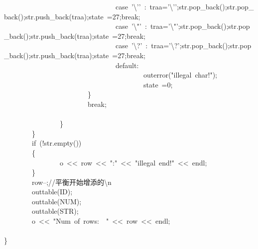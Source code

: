 \documentclass{article}
\begin{document}
\begin{mdpre}
~~~~~~~~~~~~~~~~~~~~~~~~~~~~~~~~{case}~{'}{\textbackslash{}'}{'}~:~traa={'}{\textbackslash{}'}{'};str.pop\_back();str.pop\_back();str.push\_back(traa);state~={27};{break};\\
~~~~~~~~~~~~~~~~~~~~~~~~~~~~~~~~{case}~{'}{\textbackslash{}"}{'}~:~traa={'}{\textbackslash{}"}{'};str.pop\_back();str.pop\_back();str.push\_back(traa);state~={27};{break};\\
~~~~~~~~~~~~~~~~~~~~~~~~~~~~~~~~{case}~{'}\textbackslash{}?{'}~:~traa={'}\textbackslash{}?{'};str.pop\_back();str.pop\_back();str.push\_back(traa);state~={27};{break};\\
~~~~~~~~~~~~~~~~~~~~~~~~~~~~~~~~{default}:\\
~~~~~~~~~~~~~~~~~~~~~~~~~~~~~~~~~~~~~~~~outerror({"}{illegal~char!}{"});\\
~~~~~~~~~~~~~~~~~~~~~~~~~~~~~~~~~~~~~~~~state~={0};\\
~~~~~~~~~~~~~~~~~~~~~~~~\}\\
~~~~~~~~~~~~~~~~~~~~~~~~{break};\\
\\
~~~~~~~~~~~~~~~~\}\\
~~~~~~~~\}\\
~~~~~~~~{if}~(!str.empty())\\
~~~~~~~~\{\\
~~~~~~~~~~~~~~~~o~\textless{}\textless{}~row~\textless{}\textless{}~{"}{:}{"}~\textless{}\textless{}~{"}{illegal~end!}{"}~\textless{}\textless{}~endl;\\
~~~~~~~~\}\\
~~~~~~~~row--;{//平衡开始增添的\textbackslash{}n}\\
~~~~~~~~outtable({ID});\\
~~~~~~~~outtable({NUM});\\
~~~~~~~~outtable({STR});\\
~~~~~~~~o~\textless{}\textless{}~{"}{Num~of~rows:~~}{"}~\textless{}\textless{}~row~\textless{}\textless{}~endl;\\
~~~~~~~~\\
\}\\
\end{mdpre}
\end{document}
